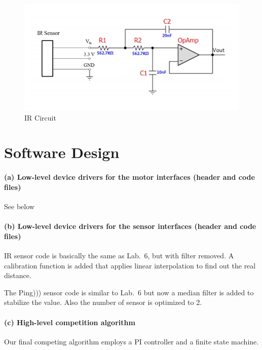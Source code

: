 \documentclass[a4paper]{article}
\newlength{\pic}
\begin{document}
\setlength{\pic}{12cm}
\begin{figure}[htp]
\center
\includegraphics[width=\pic]{circuits/IR_Circuit}
\caption{IR Circuit} \label{ir}
\end{figure}


\section{Software Design}

\lstset{language=C, style=MyCStyle}

\paragraph{(a) Low-level device drivers for the motor interfaces (header and code files) \\}
{
See below


}

\paragraph{(b) Low-level device drivers for the sensor interfaces (header and code files) \\}
{
IR sensor code is basically the same as Lab.\ 6, but with filter removed. A calibration function is added
that applies linear interpolation to find out the real distance.




The Ping))) sensor code is similar to Lab.\ 6 but now a median filter is added to stabilize the value. Also
the number of sensor is optimized to 2.




}

\paragraph{(c) High-level competition algorithm \\}
{
Our final competing algorithm employs a PI controller and a finite state machine.


}
\end{document}
